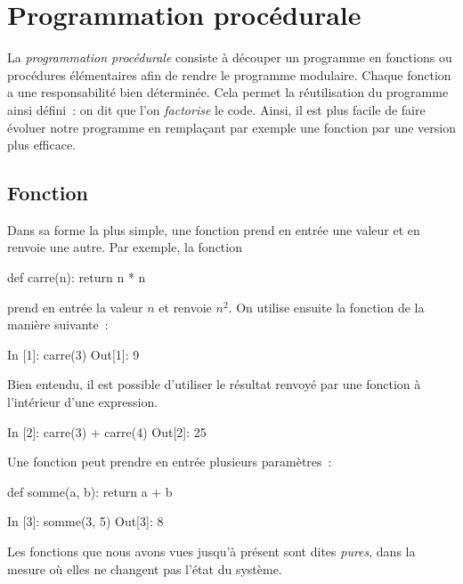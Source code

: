 \documentclass{magnoliaold}
\begin{document}
\magtoc



\section{Programmation procédurale}

La \emph{programmation procédurale} consiste à découper un programme en fonctions ou
procédures élémentaires afin de rendre le programme modulaire. Chaque fonction a une
responsabilité bien déterminée. Cela permet la réutilisation du programme ainsi défini~:
on dit que l'on \emph{factorise} le code.
Ainsi, il est plus facile de faire évoluer notre programme en
remplaçant par exemple une fonction par une version plus efficace.


\subsection{Fonction}

 Dans sa forme la plus simple, une fonction prend en entrée une valeur et en renvoie une autre. Par exemple, la fonction

\begin{pythoncodeline}
def carre(n):
    return n * n
\end{pythoncodeline}

\noindent prend en entrée la valeur $n$ et renvoie $n^2$. On utilise
ensuite la fonction de la manière suivante~:

\begin{pythoncode}
In [1]: carre(3)
Out[1]: 9
\end{pythoncode}

\noindent Bien entendu, il est possible d'utiliser le résultat renvoyé par une fonction à
l'intérieur d'une expression.

\begin{pythoncode}
In [2]: carre(3) + carre(4)
Out[2]: 25 
\end{pythoncode}

Une fonction peut prendre en entrée plusieurs paramètres~:

\begin{pythoncodeline}
def somme(a, b):
    return a + b
\end{pythoncodeline}

\begin{pythoncode}
In [3]: somme(3, 5)
Out[3]: 8
\end{pythoncode}

\noindent
Les fonctions que nous avons vues jusqu'à présent sont dites \emph{pures}, dans la mesure où elles ne changent pas l'état du système.\\
\end{document}
